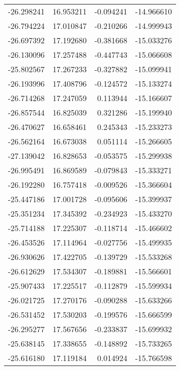 \begin{tabular}{rrrr}
      -26.298241 &        16.953211 &   -0.094241 & -14.966610 \\
      -26.794224 &        17.010847 &   -0.210266 & -14.999943 \\
      -26.697392 &        17.192680 &   -0.381668 & -15.033276 \\
      -26.130096 &        17.257488 &   -0.447743 & -15.066608 \\
      -25.802567 &        17.267233 &   -0.327882 & -15.099941 \\
      -26.193996 &        17.408796 &   -0.124572 & -15.133274 \\
      -26.714268 &        17.247059 &    0.113944 & -15.166607 \\
      -26.857544 &        16.825039 &    0.321286 & -15.199940 \\
      -26.470627 &        16.658461 &    0.245343 & -15.233273 \\
      -26.562164 &        16.673038 &    0.051114 & -15.266605 \\
      -27.139042 &        16.828653 &   -0.053575 & -15.299938 \\
      -26.995491 &        16.869589 &   -0.079843 & -15.333271 \\
      -26.192280 &        16.757418 &   -0.009526 & -15.366604 \\
      -25.447186 &        17.001728 &   -0.095606 & -15.399937 \\
      -25.351234 &        17.345392 &   -0.234923 & -15.433270 \\
      -25.714188 &        17.225307 &   -0.118714 & -15.466602 \\
      -26.453526 &        17.114964 &   -0.027756 & -15.499935 \\
      -26.930626 &        17.422705 &   -0.139729 & -15.533268 \\
      -26.612629 &        17.534307 &   -0.189881 & -15.566601 \\
      -25.907433 &        17.225517 &   -0.112879 & -15.599934 \\
      -26.021725 &        17.270176 &   -0.090288 & -15.633266 \\
      -26.531452 &        17.530203 &   -0.199576 & -15.666599 \\
      -26.295277 &        17.567656 &   -0.233837 & -15.699932 \\
      -25.638145 &        17.338655 &   -0.148892 & -15.733265 \\
      -25.616180 &        17.119184 &    0.014924 & -15.766598 \\

\end{tabular}
